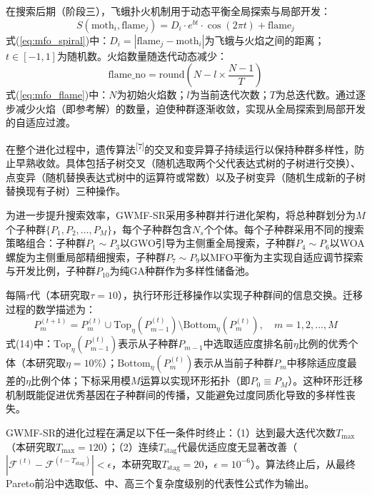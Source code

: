 \documentclass[a4paper,12pt]{ctexart}
\begin{document}
在搜索后期（阶段三），飞蛾扑火机制用于动态平衡全局探索与局部开发：
\begin{equation}
  S(\text{moth}_i, \text{flame}_j) = D_i \cdot e^{bt} \cdot \cos(2\pi t) + \text{flame}_j \tag{7}
  \label{eq:mfo_spiral}
\end{equation}
式(\ref{eq:mfo_spiral})中：$D_i = |\text{flame}_j - \text{moth}_i|$为飞蛾与火焰之间的距离；$t \in [-1, 1]$为随机数。火焰数量随迭代动态减少：
\begin{equation}
  \text{flame\_no} = \text{round}\left(N - l \times \frac{N-1}{T}\right) \tag{8}
  \label{eq:mfo_flame}
\end{equation}
式(\ref{eq:mfo_flame})中：$N$为初始火焰数；$l$为当前迭代次数；$T$为总迭代数。通过逐步减少火焰（即参考解）的数量，迫使种群逐渐收敛，实现从全局探索到局部开发的自适应过渡。

在整个进化过程中，遗传算法\textsuperscript{[7]}的交叉和变异算子持续运行以保持种群多样性，防止早熟收敛。具体包括子树交叉（随机选取两个父代表达式树的子树进行交换）、点变异（随机替换表达式树中的运算符或常数）以及子树变异（随机生成新的子树替换现有子树）三种操作。

为进一步提升搜索效率，GWMF-SR采用多种群并行进化架构，将总种群划分为$M$个子种群$\{P_1, P_2, \ldots, P_M\}$，每个子种群包含$N_s$个个体。每个子种群采用不同的搜索策略组合：子种群$P_1 \sim P_3$以GWO引导为主侧重全局搜索，子种群$P_4 \sim P_6$以WOA螺旋为主侧重局部精细搜索，子种群$P_7 \sim P_9$以MFO平衡为主实现自适应调节探索与开发比例，子种群$P_{10}$为纯GA种群作为多样性储备池。

每隔$\tau$代（本研究取$\tau=10$），执行环形迁移操作以实现子种群间的信息交换。迁移过程的数学描述为：
\begin{equation}
P_m^{(t+1)} = P_m^{(t)} \cup \text{Top}_\eta(P_{m-1}^{(t)}) \setminus \text{Bottom}_\eta(P_m^{(t)}), \quad m = 1, 2, \ldots, M \tag{14}
\end{equation}
式(14)中：$\text{Top}_\eta(P_{m-1}^{(t)})$表示从子种群$P_{m-1}$中选取适应度排名前$\eta$比例的优秀个体（本研究取$\eta=10\%$）；$\text{Bottom}_\eta(P_m^{(t)})$表示从当前子种群$P_m$中移除适应度最差的$\eta$比例个体；下标采用模$M$运算以实现环形拓扑（即$P_0 \equiv P_M$）。这种环形迁移机制既能促进优秀基因在子种群间的传播，又能避免过度同质化导致的多样性丧失。

GWMF-SR的进化过程在满足以下任一条件时终止：（1）达到最大迭代次数$T_{\max}$（本研究取$T_{\max}=120$）；（2）连续$T_{\text{stag}}$代最优适应度无显著改善（$|\mathcal{F}^{(t)} - \mathcal{F}^{(t-T_{\text{stag}})}| < \epsilon$，本研究取$T_{\text{stag}}=20$，$\epsilon=10^{-6}$）。算法终止后，从最终Pareto前沿中选取低、中、高三个复杂度级别的代表性公式作为输出。
\end{document}
